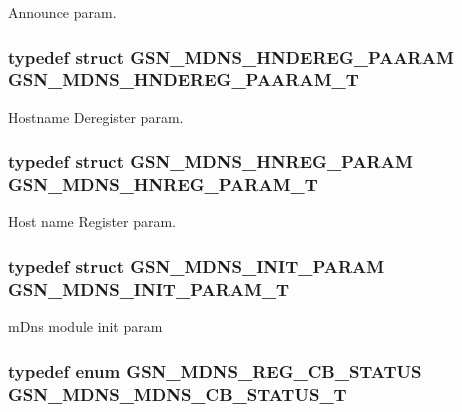 Announce param. 

\hypertarget{a00668_gae0bea67d1615b20dc8df1775f73c98ca}{
\subsubsection[{GSN\_\-MDNS\_\-HNDEREG\_\-PAARAM\_\-T}]{\setlength{\rightskip}{0pt plus 5cm}typedef struct {\bf GSN\_\-MDNS\_\-HNDEREG\_\-PAARAM} {\bf GSN\_\-MDNS\_\-HNDEREG\_\-PAARAM\_\-T}}}
\label{a00668_gae0bea67d1615b20dc8df1775f73c98ca}


Hostname Deregister param. 

\hypertarget{a00668_ga511a566bafeaf7323d968328226d0c4a}{
\subsubsection[{GSN\_\-MDNS\_\-HNREG\_\-PARAM\_\-T}]{\setlength{\rightskip}{0pt plus 5cm}typedef struct {\bf GSN\_\-MDNS\_\-HNREG\_\-PARAM} {\bf GSN\_\-MDNS\_\-HNREG\_\-PARAM\_\-T}}}
\label{a00668_ga511a566bafeaf7323d968328226d0c4a}


Host name Register param. 

\hypertarget{a00668_ga1ef3eac492349f066a53f0d1760152ee}{
\subsubsection[{GSN\_\-MDNS\_\-INIT\_\-PARAM\_\-T}]{\setlength{\rightskip}{0pt plus 5cm}typedef struct {\bf GSN\_\-MDNS\_\-INIT\_\-PARAM} {\bf GSN\_\-MDNS\_\-INIT\_\-PARAM\_\-T}}}
\label{a00668_ga1ef3eac492349f066a53f0d1760152ee}


mDns module init param 

\hypertarget{a00668_gab2cd71424a7a8f16216fe22eb24e31b3}{
\subsubsection[{GSN\_\-MDNS\_\-MDNS\_\-CB\_\-STATUS\_\-T}]{\setlength{\rightskip}{0pt plus 5cm}typedef enum {\bf GSN\_\-MDNS\_\-REG\_\-CB\_\-STATUS} {\bf GSN\_\-MDNS\_\-MDNS\_\-CB\_\-STATUS\_\-T}}}
\label{a00668_gab2cd71424a7a8f16216fe22eb24e31b3}


